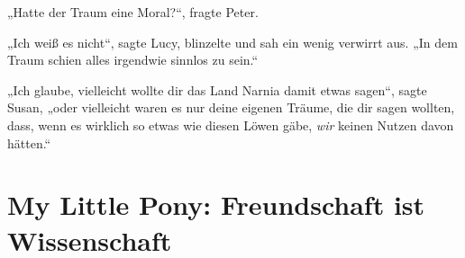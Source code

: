 „Hatte der Traum eine Moral?“, fragte Peter.

„Ich weiß es nicht“, sagte Lucy, blinzelte und sah ein wenig verwirrt aus.
„In dem Traum schien alles irgendwie sinnlos zu sein.“

„Ich glaube, vielleicht wollte dir das Land Narnia damit etwas sagen“, sagte Susan, „oder vielleicht waren es nur deine eigenen Träume, die dir sagen wollten, dass, wenn es wirklich so etwas wie diesen Löwen gäbe, \emph{wir} keinen Nutzen davon hätten.“

\section{My Little Pony: Freundschaft ist Wissenschaft}

